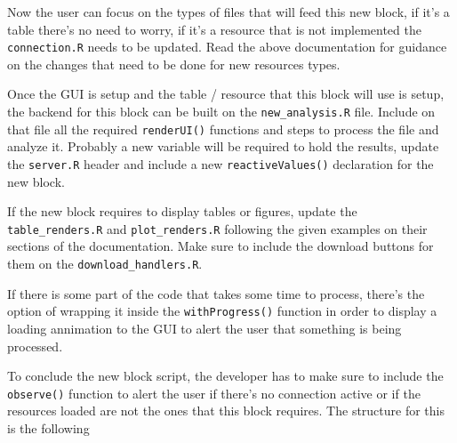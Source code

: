 \documentclass[
]{book}
\newenvironment{Shaded}{\begin{snugshade}}{\end{snugshade}}
\newcommand{\CommentTok}[1]{\textcolor[rgb]{0.56,0.35,0.01}{\textit{#1}}}
\newcommand{\ControlFlowTok}[1]{\textcolor[rgb]{0.13,0.29,0.53}{\textbf{#1}}}
\newcommand{\DataTypeTok}[1]{\textcolor[rgb]{0.13,0.29,0.53}{#1}}
\newcommand{\KeywordTok}[1]{\textcolor[rgb]{0.13,0.29,0.53}{\textbf{#1}}}
\newcommand{\NormalTok}[1]{#1}
\newcommand{\OperatorTok}[1]{\textcolor[rgb]{0.81,0.36,0.00}{\textbf{#1}}}
\newcommand{\StringTok}[1]{\textcolor[rgb]{0.31,0.60,0.02}{#1}}
\begin{document}
Now the user can focus on the types of files that will feed this new block, if it's a table there's no need to worry, if it's a resource that is not implemented the \texttt{connection.R} needs to be updated. Read the above documentation for guidance on the changes that need to be done for new resources types.

Once the GUI is setup and the table / resource that this block will use is setup, the backend for this block can be built on the \texttt{new\_analysis.R} file. Include on that file all the required \texttt{renderUI()} functions and steps to process the file and analyze it. Probably a new variable will be required to hold the results, update the \texttt{server.R} header and include a new \texttt{reactiveValues()} declaration for the new block.

If the new block requires to display tables or figures, update the \texttt{table\_renders.R} and \texttt{plot\_renders.R} following the given examples on their sections of the documentation. Make sure to include the download buttons for them on the \texttt{download\_handlers.R}.

If there is some part of the code that takes some time to process, there's the option of wrapping it inside the \texttt{withProgress()} function in order to display a loading annimation to the GUI to alert the user that something is being processed.

To conclude the new block script, the developer has to make sure to include the \texttt{observe()} function to alert the user if there's no connection active or if the resources loaded are not the ones that this block requires. The structure for this is the following

\begin{Shaded}
\end{Shaded}
\end{document}
